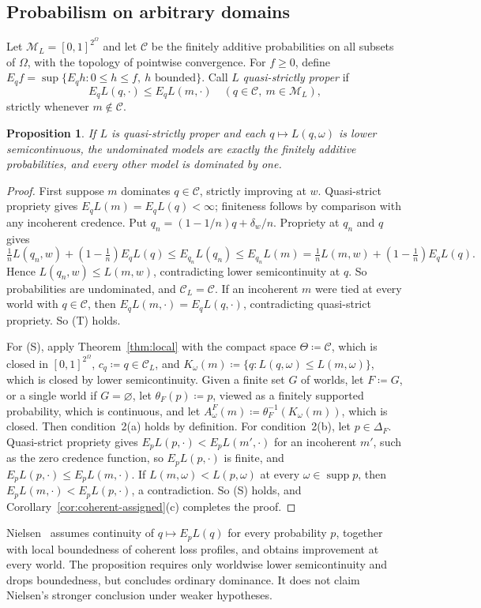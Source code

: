\documentclass[11pt]{article}
\newtheorem{proposition}[theorem]{Proposition}
\theoremstyle{definition}
\newcommand{\M}{\mathcal M}
\newcommand{\C}{\mathcal C}
\newcommand{\supp}{\operatorname{supp}}
\begin{document}
\subsection{Probabilism on arbitrary domains}
Let $\M_L=[0,1]^{2^\Omega}$ and let $\C$ be the finitely additive probabilities on all subsets of $\Omega$, with the topology of pointwise convergence. For $f\ge0$, define $E_qf=\sup\{E_qh:0\le h\le f,\ h\text{ bounded}\}$. Call $L$ \emph{quasi-strictly proper} if
\[
E_qL(q,\cdot)\le E_qL(m,\cdot)\quad(q\in\C,\ m\in\M_L),
\]
strictly whenever $m\notin\C$.
\begin{proposition}\label{prop:short-infinite}
If $L$ is quasi-strictly proper and each $q\mapsto L(q,\omega)$ is lower semicontinuous, the undominated models are exactly the finitely additive probabilities, and every other model is dominated by one.
\end{proposition}
\begin{proof}
First suppose $m$ dominates $q\in\C$, strictly improving at $w$. Quasi-strict propriety gives $E_qL(m)=E_qL(q)<\infty$; finiteness follows by comparison with any incoherent credence. Put $q_n=(1-1/n)q+\delta_w/n$. Propriety at $q_n$ and $q$ gives
\[
\tfrac1nL(q_n,w)+(1-\tfrac1n)E_qL(q)
\le E_{q_n}L(q_n)\le E_{q_n}L(m)
=\tfrac1nL(m,w)+(1-\tfrac1n)E_qL(q).
\]
Hence $L(q_n,w)\le L(m,w)$, contradicting lower semicontinuity at $q$. So probabilities are undominated{\color{red}, and $\C_L=\C$. If an incoherent $m$ were tied at every world with $q\in\C$, then $E_qL(m,\cdot)=E_qL(q,\cdot)$, contradicting quasi-strict propriety. So (T) holds.}

{\color{red}For (S), apply Theorem~\ref{thm:local} with the compact space $\Theta\coloneqq\C$, which is closed in $[0,1]^{2^\Omega}$, $c_q\coloneqq q\in\C_L$, and $K_\omega(m)\coloneqq\{q:L(q,\omega)\le L(m,\omega)\}$, which is closed by lower semicontinuity. Given a finite set $G$ of worlds, let $F\coloneqq G$, or a single world if $G=\varnothing$, let $\theta_F(p)\coloneqq p$, viewed as a finitely supported probability, which is continuous, and let $A^F_\omega(m)\coloneqq\theta_F^{-1}(K_\omega(m))$, which is closed. Then condition~2(a) holds by definition. For condition~2(b), let $p\in\Delta_F$. Quasi-strict propriety gives $E_pL(p,\cdot)<E_pL(m',\cdot)$ for an incoherent $m'$, such as the zero credence function, so $E_pL(p,\cdot)$ is finite, and $E_pL(p,\cdot)\le E_pL(m,\cdot)$. If $L(m,\omega)<L(p,\omega)$ at every $\omega\in\supp p$, then $E_pL(m,\cdot)<E_pL(p,\cdot)$, a contradiction. So (S) holds, and Corollary~\ref{cor:coherent-assigned}(c) completes the proof.}
\end{proof}
Nielsen~\cite{Nielsen2023} assumes continuity of $q\mapsto E_pL(q)$ for every probability $p$, together with local boundedness of coherent loss profiles, and obtains improvement at every world. The proposition requires only worldwise lower semicontinuity and drops boundedness, but concludes ordinary dominance. It does not claim Nielsen's stronger conclusion under weaker hypotheses.
\end{document}
